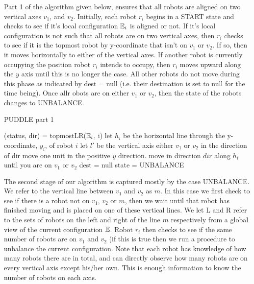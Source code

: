 \documentclass[preprint,10pt]{elsarticle}
\begin{document}
	Part 1 of the algorithm given below, ensures that all robots are aligned on two vertical axes $v_1$, and $v_2$.
	Initially, each robot $r_i$ begins in a START state and checks to see if it's local configuration $\mathbb{E}_i$ is
	aligned or not. If it's local configuration is not such that all robots are on two vertical axes, then
	$r_i$ checks to see if it is the topmost robot by y-coordinate that isn't on $v_1$ or $v_2$. If so, then it
	moves horizontally to either of the vertical axes. If another robot is currently occupying the position
	robot $r_i$ intends to occupy, then $r_i$ moves upward along the $y$ axis until this is no longer the case.
	All other robots do not move during this phase as indicated by dest = null (i.e. their destination is set
	to null for the time being). Once allr obots are on either $v_1$ or $v_2$, then the state of the robots
	changes to UNBALANCE.
	\begin{algorithm}[H]
	\begin{algorithmic}[1]
	\caption{PUDDLE part 1}

					\State (status, dir) = topmostLR($\mathbb{E}_i$, i)
						\State let $h_i$ be the horizontal line through the y-coordinate, $y_i$, of robot $i$
						\State let $l'$ be the vertical axis either $v_1$ or $v_2$ in the direction of dir
							\State move one unit in the positive $y$ direction.
						\EndIf
						\State move in direction $dir$ along $h_i$ until you are on $v_1$ or $v_2$
					\EndIf
				\Else
					\State dest = null
				\EndIf
					\State state = UNBALANCE
				\EndIf
			\EndCase
	\EndProcedure
	\end{algorithmic}
	\end{algorithm}

	The second stage of our algorithm is captured mostly by the case UNBALANCE. We refer to the
	vertical line between $v_1$ and $v_2$ as $m$. In this case
	we first check to see if there is a robot not on $v_1$, $v_2$ or $m$, then we wait until
	that robot has finished moving and is placed on one of these vertical lines. 
	We let L and R refer to the sets of robots on the left and right of the line $m$ respectively from a global view
	of the current configuration $\mathbb{E}$. Robot $r_i$ then checks to see if the same number of 
	robots are on $v_1$ and $v_2$ (if this is true then we run a procedure to unbalance the current configuration.
	Note that each robot has knowledge of how many robots there are in total, and can directly observe
	how many robots are on every vertical axis except his/her own. This is enough information to know the
	number of robots on each axis. \\
\end{document}
